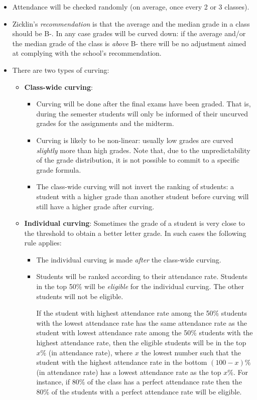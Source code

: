 \documentclass[12]{article}
\begin{document}
\begin{itemize}
\item Attendance will be checked randomly (on average, once every 2 or
  3 classes).
\item Zicklin's \textit{recommendation} is that the average and the
  median grade in a class should be B-. In any case grades will be
  curved down:  if the average and/or the median grade of the
  class is \textit{above} B- there will be no adjustment aimed at
  complying with the school's recommendation. 
\item There are two types of curving: 
    
    \begin{itemize}

    \item \textbf{Class-wide curving}:
        \begin{itemize}
        \item Curving will be done after the final exams have been
        graded. That is, during the semester students will only be informed of their uncurved grades for the assignments and the midterm. 
        \item Curving is likely to be non-linear: usually  low
  grades are curved \textit{slightly} more than high grades. Note
  that, due to
  the unpredictability of the grade distribution, it is not possible to
  commit to a specific grade formula. 
        \item The class-wide curving will
  not invert the ranking of students: a student with a higher grade
  than another student  before curving will still have a higher grade
  after curving. 
        \end{itemize}
    
    \item \textbf{Individual curving}: Sometimes the grade of a student is very close to the threshold to obtain a better letter grade. In such cases the following rule applies:
    
        \begin{itemize}
        \item The individual curving is made \textit{after} the class-wide curving. 
        \item Students will be ranked according to their attendance rate. Students in the top  50\% will be \textit{eligible} for the individual curving. The other students will not be eligible.
        \medskip 

If the student with highest attendance rate among the 50\% students
with the lowest attendance rate  has the same  attendance rate as the student 
with lowest attendance rate among the 50\% students with the highest
attendance rate, then the eligible students will be in the top $x\%$
(in attendance rate), where $x$ the lowest number  such that
the student with the highest attendance rate in the bottom $(100-x)\%$
(in attendance rate) has a lowest attendance rate as the top
$x\%$. For instance, if 80\% of the class has a perfect 
attendance rate then the  80\% of the students with a perfect
attendance rate will be eligible.


\end{itemize}
\end{itemize}
\end{itemize}
\end{document}
